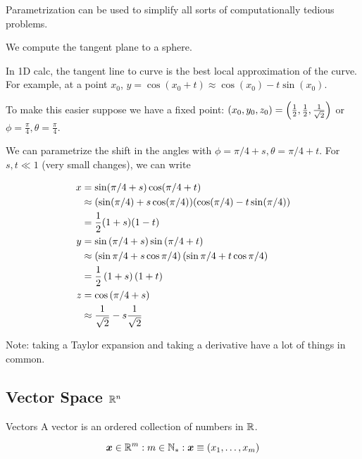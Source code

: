 \documentclass[11pt]{article}
\begin{document}
Parametrization can be used to simplify all sorts of computationally tedious problems.

\begin{example}
  
  We compute the tangent plane to a sphere.

  In 1D calc, the tangent line to curve is the best local approximation of the curve.
  For example, at a point $x_0$,  $y = \cos(x_0 + t) \approx \cos(x_0) - t \sin(x_0)$.

  To make this easier suppose we have a fixed point: $(x_0, y_0, z_0) = \left ( \frac{1}{2}, \frac{1}{2}, \frac{1}{\sqrt{2}} \right)$ or $\phi = \frac{\pi}{4}, \theta = \frac{\pi}{4}$.

  We can parametrize the shift in the angles with $\phi = \pi/4 + s, \theta = \pi/4 + t$. For $s, t \ll 1$ (very small changes), we can write

  \begin{align*}
    x &= \sin(\pi/4 + s)\cos(\pi/4 + t) \\
      & \approx (\sin(\pi/4) + s \cos(\pi/4))(\cos(\pi/4) - t \sin(\pi/4)) \\
      &= \frac{1}{2} (1+s)(1-t) \\
    y &= \sin \left ( \pi/4 + s \right) \sin \left ( \pi/4 + t \right) \\
      & \approx \left ( \sin \pi/4 + s \cos \pi/4 \right)  \left ( \sin \pi/4 + t \cos \pi/4 \right) \\
      &= \frac{1}{2} \left ( 1+s \right) \left ( 1+t \right) \\
    z &= \cos \left ( \pi/4 + s \right) \\
      & \approx \frac{1}{\sqrt{2}} - s \frac{1}{\sqrt{2}} \\
  \end{align*}

  Note: taking a Taylor expansion and taking a derivative have a lot of things in common.
\end{example}





\subsection{Vector Space $\mathbb R^n$}

\begin{definition}{Vectors}
  A vector is an ordered collection of numbers in $\mathbb R$.

  $$\bm{x} \in \mathbb R^m : m \in \mathbb N_* : \bm{x} \equiv (x_1, \dots, x_m)$$
\end{definition}
\end{document}
